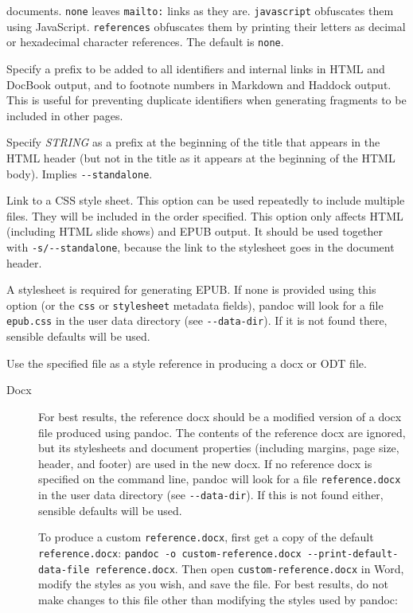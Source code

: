 \documentclass[
  a4paper,
]{article}
\begin{document}
\begin{description}
documents. \texttt{none} leaves \texttt{mailto:} links as they are.
\texttt{javascript} obfuscates them using JavaScript.
\texttt{references} obfuscates them by printing their letters as decimal
or hexadecimal character references. The default is \texttt{none}.
\item[\texttt{-\/-id-prefix=}\emph{STRING}]
Specify a prefix to be added to all identifiers and internal links in
HTML and DocBook output, and to footnote numbers in Markdown and Haddock
output. This is useful for preventing duplicate identifiers when
generating fragments to be included in other pages.
\item[\texttt{-T} \emph{STRING},
\texttt{-\/-title-prefix=}\emph{STRING}]
Specify \emph{STRING} as a prefix at the beginning of the title that
appears in the HTML header (but not in the title as it appears at the
beginning of the HTML body). Implies \texttt{-\/-standalone}.
\item[\texttt{-c} \emph{URL}, \texttt{-\/-css=}\emph{URL}]
Link to a CSS style sheet. This option can be used repeatedly to include
multiple files. They will be included in the order specified. This
option only affects HTML (including HTML slide shows) and EPUB output.
It should be used together with \texttt{-s/-\/-standalone}, because the
link to the stylesheet goes in the document header.

A stylesheet is required for generating EPUB. If none is provided using
this option (or the \texttt{css} or \texttt{stylesheet} metadata
fields), pandoc will look for a file \texttt{epub.css} in the user data
directory (see \texttt{-\/-data-dir}). If it is not found there,
sensible defaults will be used.
\item[\texttt{-\/-reference-doc=}\emph{FILE}\textbar{}\emph{URL}]
Use the specified file as a style reference in producing a docx or ODT
file.

\begin{description}
\item[Docx]
For best results, the reference docx should be a modified version of a
docx file produced using pandoc. The contents of the reference docx are
ignored, but its stylesheets and document properties (including margins,
page size, header, and footer) are used in the new docx. If no reference
docx is specified on the command line, pandoc will look for a file
\texttt{reference.docx} in the user data directory (see
\texttt{-\/-data-dir}). If this is not found either, sensible defaults
will be used.

To produce a custom \texttt{reference.docx}, first get a copy of the
default \texttt{reference.docx}:
\texttt{pandoc\ -o\ custom-reference.docx\ -\/-print-default-data-file\ reference.docx}.
Then open \texttt{custom-reference.docx} in Word, modify the styles as
you wish, and save the file. For best results, do not make changes to
this file other than modifying the styles used by pandoc:


\end{description}
\end{description}
\end{document}
